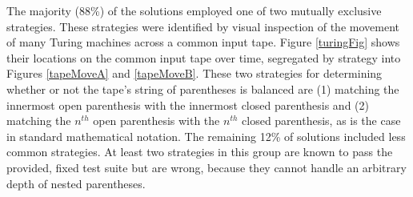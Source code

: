 \documentclass[12pt]{article}
\begin{document}
The majority (88\%) of the solutions employed one of two mutually exclusive strategies. These strategies were identified by visual inspection of the movement of many Turing machines across a common input tape. Figure \ref{turingFig} shows their locations on the common input tape over time, segregated by strategy into Figures \ref{tapeMoveA} and \ref{tapeMoveB}. These two strategies for determining whether or not the tape's string of parentheses is balanced are (1) matching the innermost open parenthesis with the innermost closed parenthesis and (2) matching the $n^{th}$ open parenthesis with the $n^{th}$ closed parenthesis, as is the case in standard mathematical notation. The remaining 12\% of solutions included less common strategies. At least two strategies in this group are known to pass the provided, fixed test suite but are wrong, because they cannot handle an arbitrary depth of nested parentheses. %
\end{document}
